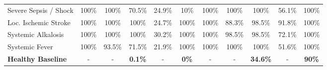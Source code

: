 \documentclass[sigconf]{acmart}
\begin{document}
\begin{table}[ht]
{\begin{tabular}{|l||ccccc|ccccc|}
Severe Sepsis / Shock & 100\% & 100\% & 70.5\% & 24.9\% & 10\% & 100\% & 100\% & 100\% & 56.1\% & 100\% \\
Loc. Ischemic Stroke  & 100\% & 100\% & 100\%  & 24.7\% & 100\% & 100\% & 88.3\%& 98.5\%& 91.8\% & 100\% \\
Systemic Alkalosis    & 100\% & 100\% & 100\%  & 30.2\% & 100\% & 100\% & 98.5\%& 98.5\%& 72.1\% & 100\% \\
Systemic Fever        & 100\% & 93.5\%& 71.5\% & 21.9\% & 100\% & 100\% & 100\% & 100\% & 51.6\% & 100\% \\
\hline
\rowcolor{gray!20} \textbf{Healthy Baseline} & - & - & \textbf{0.1\%}& - & \textbf{0\%} & - & - & \textbf{34.6\%}& - & \textbf{90\%} \\
\hline
\end{tabular}
}
\end{table}

\begin{table}[htbp]
    \centering
    \scriptsize
    \renewcommand{\arraystretch}{1.2}
    \setlength{\tabcolsep}{6pt}
    \caption{Empirically Calibrated Likelihoods (TPR and FPR). These values were extracted exclusively from the Tuning Dataset and utilized as fixed spatial priors in the Bayesian diagnostic layer .}
    \label{tab:calibrated_likelihoods}
\end{table}
\end{document}

